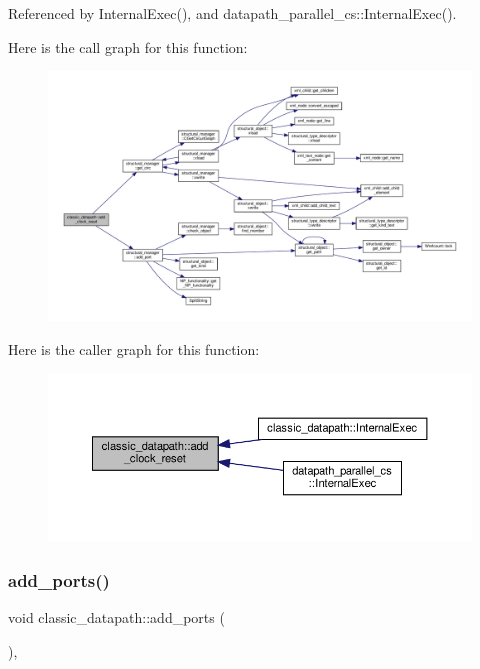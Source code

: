 Referenced by Internal\+Exec(), and datapath\+\_\+parallel\+\_\+cs\+::\+Internal\+Exec().

Here is the call graph for this function\+:
\nopagebreak
\begin{figure}[H]
\begin{center}
\leavevmode
\includegraphics[width=350pt]{d3/d74/classclassic__datapath_ae85a2f537298fac7a7f458b491ea94a5_cgraph}
\end{center}
\end{figure}
Here is the caller graph for this function\+:
\nopagebreak
\begin{figure}[H]
\begin{center}
\leavevmode
\includegraphics[width=350pt]{d3/d74/classclassic__datapath_ae85a2f537298fac7a7f458b491ea94a5_icgraph}
\end{center}
\end{figure}
\mbox{\label{classclassic__datapath_a857c8c07a0bb612dd5e36bba9c48a14d}} 
\subsubsection{\texorpdfstring{add\+\_\+ports()}{add\_ports()}}
{\footnotesize\ttfamily void classic\+\_\+datapath\+::add\+\_\+ports (\begin{DoxyParamCaption}{ }\end{DoxyParamCaption})\hspace{0.3cm}{\ttfamily [protected]}, {\ttfamily [virtual]}}



